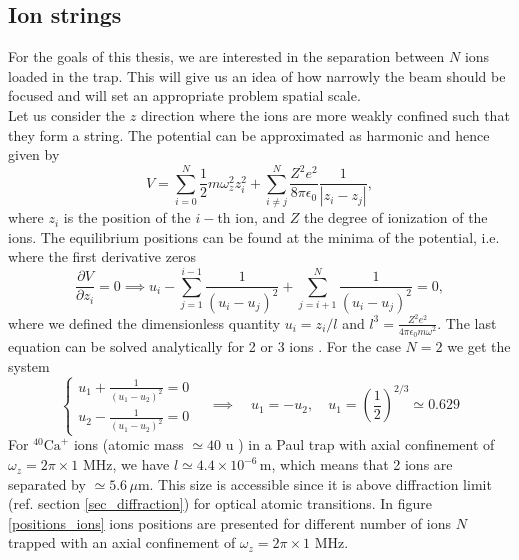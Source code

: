 \subsection{Ion strings}
\label{ionstrings}
For the goals of this thesis, we are interested in the separation between $N$ ions loaded in the trap. This will give us an idea of how narrowly the beam should be focused and will set an appropriate problem spatial scale.\\
Let us consider the $z$ direction where the ions are more weakly confined such that they form a string. The potential can be approximated as harmonic and hence given by
\begin{equation}
V = \sum_{i=0}^N \frac{1}{2}m\omega_z^2z_i^2 + \sum_{i\neq j}^N\frac{Z^2e^2}{8\pi \epsilon_0}\frac{1}{|z_i-z_j|},
\end{equation}
where $z_i$ is the position of the $i-$th ion, and $Z$ the degree of ionization of the ions. The equilibrium positions can be found at the minima of the potential, i.e. where the first derivative zeros
\begin{equation}
\frac{\partial V}{\partial z_i} = 0 \implies u_i - \sum_{j=1}^{i-1} \frac{1}{(u_i-u_j)^2} + \sum_{j= i+1}^{N} \frac{1}{(u_i-u_j)^2}= 0,
\end{equation}
where we defined the dimensionless quantity $u_i = z_i/l$ and $l^3 = \displaystyle\frac{Z^2 e^2 }{4\pi \epsilon_0 m\omega^2}$.
The last equation can be solved analytically for 2 or 3 ions \cite{ion_spacing}. For the case $N=2$ we get the system
\begin{equation}
\begin{cases}
  u_1 + \frac{1}{(u_1-u_2)^2} = 0\\
  u_2 - \frac{1}{(u_1-u_2)^2} = 0
  \end{cases} \quad \implies \quad u_1 = -u_2,\quad  u_1 = \left(\frac{1}{2}\right)^{2/3} \simeq 0.629
\end{equation}
For $^{40}\text{Ca}^+$ ions (atomic mass $\simeq 40$ u \cite{AUDI2003337}) in a Paul trap with axial confinement of $\omega_z = 2\pi \times 1$ MHz, we have $l \simeq 4.4\times 10^{-6}\,$m, which means that 2 ions are separated by $\simeq 5.6\, \mu$m. This size is accessible since it is above diffraction limit (ref. section \ref{sec_diffraction}) for optical atomic transitions.
In figure \ref{positions_ions} ions positions are presented for different number of ions $N$ trapped with an axial confinement of $\omega_z = 2\pi \times 1$ MHz.

